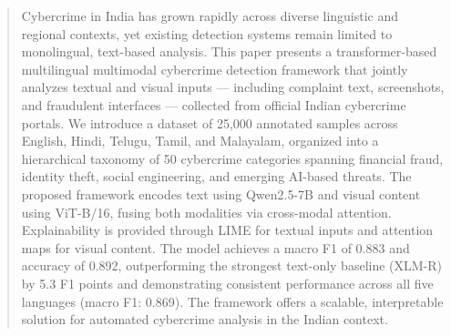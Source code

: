 \begin{abstract}
Cybercrime in India has grown rapidly across diverse linguistic and regional contexts,
yet existing detection systems remain limited to monolingual, text-based analysis.
This paper presents a transformer-based multilingual multimodal cybercrime detection
framework that jointly analyzes textual and visual inputs — including complaint text,
screenshots, and fraudulent interfaces — collected from official Indian cybercrime
portals. We introduce a dataset of 25,000 annotated samples across English, Hindi,
Telugu, Tamil, and Malayalam, organized into a hierarchical taxonomy of 50 cybercrime
categories spanning financial fraud, identity theft, social engineering, and emerging
AI-based threats. The proposed framework encodes text using Qwen2.5-7B and visual
content using ViT-B/16, fusing both modalities via cross-modal attention. Explainability
is provided through LIME for textual inputs and attention maps for visual content.
The model achieves a macro F1 of 0.883 and accuracy of 0.892, outperforming the
strongest text-only baseline (XLM-R) by 5.3 F1 points and demonstrating consistent
performance across all five languages (macro F1: 0.869). The framework offers a
scalable, interpretable solution for automated cybercrime analysis in the Indian context.
\end{abstract}